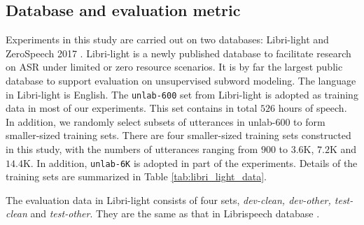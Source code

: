 \documentclass[a4paper]{article}
\begin{document}
\subsection{Database and evaluation metric}
Experiments in this study are carried out on two databases: Libri-light \cite{kahn2019librilight} and ZeroSpeech 2017 \cite{dunbar2017zero}. Libri-light is a newly published   database to facilitate research on ASR under limited or zero resource scenarios. It is by far the largest public database to support evaluation on unsupervised subword modeling. The language in Libri-light is English. The \texttt{unlab-600} set from Libri-light is adopted as training data in most of our experiments. This set contains 
in total $526$ hours of speech. In addition, we randomly select subsets of utterances in unlab-600   to form smaller-sized training sets. There are four smaller-sized training sets constructed in this study, with the numbers of utterances ranging from $900$ to $3.6$K, $7.2$K and $14.4$K. In addition, \texttt{unlab-6K} is adopted in part of the experiments. Details of the training sets are summarized in Table \ref{tab:libri_light_data}.
\begin{table}[htbp]
\renewcommand\arraystretch{0.90}
\centering
\caption{Libri-light training data and its subsets.}
\label{tab:libri_light_data}
\end{table}
The evaluation data in Libri-light consists of four sets, \textit{dev-clean, dev-other, test-clean} and \textit{test-other}. 
They are the same as that in Librispeech database \cite{panayotov2015librispeech}.
\end{document}
